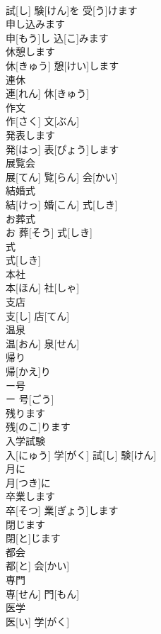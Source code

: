 \documentclass[8pt]{extreport}
\begin{document}
\begin{CJK}{UTF8}{min}
\\	試[し] 験[けん]を 受[う]けます		
\\	申し込みます	
\\	申[もう]し 込[こ]みます		
\\	休憩します	
\\	休[きゅう] 憩[けい]します		
\\	連休	
\\	連[れん] 休[きゅう]		
\\	作文	
\\	作[さく] 文[ぶん]		
\\	発表します	
\\	発[はっ] 表[ぴょう]します		
\\	展覧会	
\\	展[てん] 覧[らん] 会[かい]		
\\	結婚式	
\\	結[けっ] 婚[こん] 式[しき]		
\\	お葬式	
\\	お 葬[そう] 式[しき]		
\\	式	
\\	式[しき]		
\\	本社	
\\	本[ほん] 社[しゃ]		
\\	支店	
\\	支[し] 店[てん]		
\\	温泉	
\\	温[おん] 泉[せん]		
\\	帰り	
\\	帰[かえ]り		
\\	ー号	
\\	ー 号[ごう]		
\\	残ります	
\\	残[のこ]ります		
\\	入学試験	
\\	入[にゅう] 学[がく] 試[し] 験[けん]		
\\	月に	
\\	月[つき]に		
\\	卒業します	
\\	卒[そつ] 業[ぎょう]します		
\\	閉じます	
\\	閉[と]じます		
\\	都会	
\\	都[と] 会[かい]		
\\	専門	
\\	専[せん] 門[もん]		
\\	医学	
\\	医[い] 学[がく]		

\end{CJK}
\end{document}
